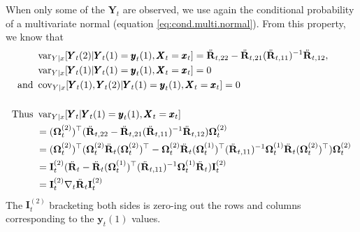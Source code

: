 \documentclass[]{article}
\def\OMG{\mbox{\boldmath $\Omega$}}
\def\IIm{\mbox{$\mathbf I$}}
\def\RR{\mbox{$\mathbf R$}}	 \def\rr{\mbox{$\mathbf r$}}
\def\XX{\mbox{$\pmb{X}$}}	\def\xx{\mbox{$\pmb{x}$}}
\def\YY{\mbox{$\pmb{Y}$}}	\def\yy{\mbox{$\pmb{y}$}}
\def\var{\,\textup{\textrm{var}}}
\def\cov{\,\textup{\textrm{cov}}}
\def\IR{\nabla}
\begin{document}
When only some of the $\YY_t$ are observed, we use again the conditional probability of a multivariate normal (equation \ref{eq:cond.multi.normal}).  From this property, we know that 
\begin{equation}\label{eq:var.Y.cond.x}
\begin{split}
&\var_{Y|x}[\YY_t(2)|\YY_t(1)=\yy_t(1),\XX_t=\xx_t]=\ddot{\RR}_{t,22} - \ddot{\RR}_{t,21}(\ddot{\RR}_{t,11})^{-1}\ddot{\RR}_{t,12},\\
&\var_{Y|x}[\YY_t(1)|\YY_t(1)=\yy_t(1),\XX_t=\xx_t]=0\\
\text{and }&\cov_{Y|x}[\YY_t(1),\YY_t(2)|\YY_t(1)=\yy_t(1),\XX_t=\xx_t]=0\\
\\
\text{Thus }&\var_{Y|x}[\YY_t|\YY_t(1)=\yy_t(1),\XX_t=\xx_t]\\
&=(\OMG_t^{(2)})^\top(\ddot{\RR}_{t,22} - \ddot{\RR}_{t,21}(\ddot{\RR}_{t,11})^{-1}\ddot{\RR}_{t,12})\OMG_t^{(2)}\\
&=(\OMG_t^{(2)})^\top(\OMG_t^{(2)}\ddot{\RR}_t(\OMG_t^{(2)})^\top - \OMG_t^{(2)}\ddot{\RR}_t(\OMG_t^{(1)})^\top(\ddot{\RR}_{t,11})^{-1}\OMG_t^{(1)}\ddot{\RR}_t(\OMG_t^{(2)})^\top)\OMG_t^{(2)}\\
&=\IIm_t^{(2)}(\ddot{\RR}_t-\ddot{\RR}_t(\OMG_t^{(1)})^\top(\ddot{\RR}_{t,11})^{-1}\OMG_t^{(1)}\ddot{\RR}_t)\IIm_t^{(2)}\\
&=\IIm_t^{(2)}\IR_t\ddot{\RR}_t\IIm_t^{(2)}
\end{split}
\end{equation}
The $\IIm_t^{(2)}$ bracketing both sides is zero-ing out the rows and columns corresponding to the $\yy_t(1)$ values.
\end{document}
